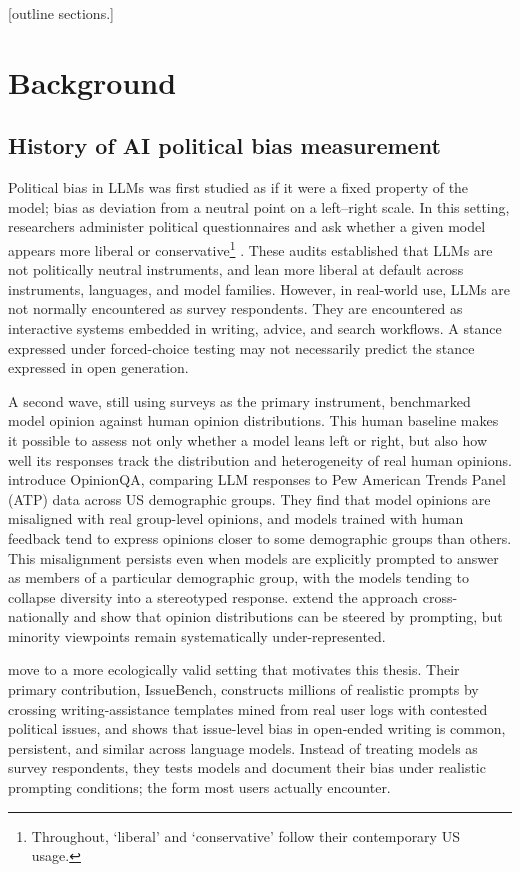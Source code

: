 [outline sections.]

\newpage
\section{Background}

\subsection{History of AI political bias measurement}

Political bias in LLMs was first studied as if it were a fixed property of the model; bias as deviation from a neutral point on a left–right scale. In this setting, researchers administer political questionnaires and ask whether a given model appears more liberal or conservative\footnote{Throughout, `liberal' and `conservative' follow their contemporary US usage.} \citep{buyl_large_2026}. These audits established that LLMs are not politically neutral instruments, and lean more liberal at default across instruments, languages, and model families. However, in real-world use, LLMs are not normally encountered as survey respondents. They are encountered as interactive systems embedded in writing, advice, and search workflows. A stance expressed under forced-choice testing may not necessarily predict the stance expressed in open generation.

A second wave, still using surveys as the primary instrument, benchmarked model opinion against human opinion distributions. This human baseline makes it possible to assess not only whether a model leans left or right, but also how well its responses track the distribution and heterogeneity of real human opinions. \citet{santurkar_whose_2023} introduce OpinionQA, comparing LLM responses to Pew American Trends Panel (ATP) data across US demographic groups. They find that model opinions are misaligned with real group-level opinions, and models trained with human feedback tend to express opinions closer to some demographic groups than others. This misalignment persists even when models are explicitly prompted to answer as members of a particular demographic group, with the models tending to collapse diversity into a stereotyped response. \citet{durmus_towards_2024} extend the approach cross-nationally and show that opinion distributions can be steered by prompting, but minority viewpoints remain systematically under-represented.

\citet{rottger_issuebench_2025} move to a more ecologically valid setting that motivates this thesis. Their primary contribution, IssueBench, constructs millions of realistic prompts by crossing writing-assistance templates mined from real user logs with contested political issues, and shows that issue-level bias in open-ended writing is common, persistent, and similar across language models. Instead of treating models as survey respondents, they tests models and document their bias under realistic prompting conditions; the form most users actually encounter.

